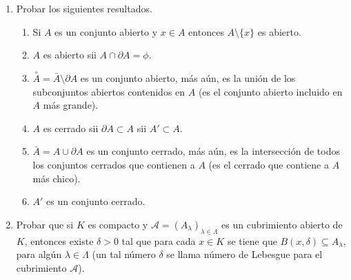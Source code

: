 \documentclass[11pt]{article}
\begin{document}
\begin{enumerate}
\begin{enumerate}
       \end{enumerate}

\item Probar los siguientes resultados.
       \begin{enumerate}
         \item Si $A$ es un conjunto abierto y $x\in A$ entonces
           $A\setminus\{ x\}$ es abierto.
         \item $A$ es abierto sii $A\cap\partial A=\phi$.
         \item $\stackrel{\circ}{A}=\bar{A}\setminus\partial A$ es un conjunto
           abierto, m\'as a\'un, es la uni\'on de los subconjuntos
           abiertos contenidos en $A$ (es el conjunto abierto incluido
           en $A$ m\'as grande).
         \item $A$ es cerrado sii $\partial A\subset A$ sii $A' \subset
           A$. 
         \item $\bar{A}=A\cup\partial A$ es un conjunto cerrado, m\'as
           a\'un, es la intersecci\'on de todos los conjuntos cerrados
           que contienen a $A$ (es el cerrado que contiene a $A$ m\'as
           chico).
         \item $A'$ es un conjunto cerrado.
       \end{enumerate}
       
\item Probar que si $K$ es compacto y
      $\mathcal{A}=(A_\lambda)_{\lambda\in\Lambda}$ es un cubrimiento
      abierto de 
      $K$, entonces existe $\delta>0$ tal que para cada $x\in K$ se tiene
      que $B(x,\delta)\subseteq A_\lambda$, para alg\'un
      $\lambda\in\Lambda$  (un tal n\'umero $\delta$ se llama n\'umero
      de Lebesgue para el cubrimiento $\mathcal{A}$).        

\end{enumerate}
\end{document}
